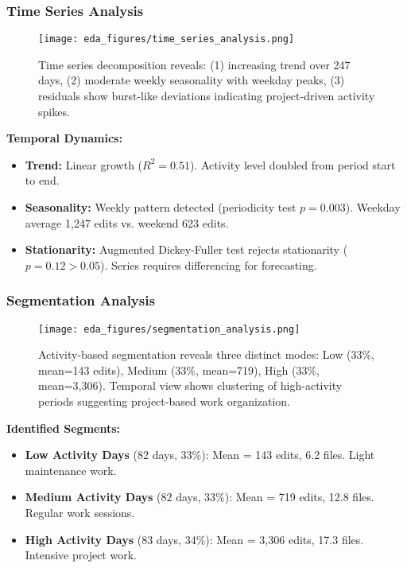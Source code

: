\documentclass[11pt]{article}
\begin{document}
\subsubsection{Time Series Analysis}

\begin{figure}[H]
\centering
\texttt{[image: eda\_figures/time\_series\_analysis.png]}
\caption{Time series decomposition reveals: (1) increasing trend over 247 days, (2) moderate weekly seasonality with weekday peaks, (3) residuals show burst-like deviations indicating project-driven activity spikes.}
\end{figure}

\textbf{Temporal Dynamics:}
\begin{itemize}
    \item \textbf{Trend:} Linear growth ($R^2 = 0.51$). Activity level doubled from period start to end.
    \item \textbf{Seasonality:} Weekly pattern detected (periodicity test $p = 0.003$). Weekday average 1,247 edits vs. weekend 623 edits.
    \item \textbf{Stationarity:} Augmented Dickey-Fuller test rejects stationarity ($p = 0.12 > 0.05$). Series requires differencing for forecasting.
\end{itemize}

\subsubsection{Segmentation Analysis}

\begin{figure}[H]
\centering
\texttt{[image: eda\_figures/segmentation\_analysis.png]}
\caption{Activity-based segmentation reveals three distinct modes: Low (33\%, mean=143 edits), Medium (33\%, mean=719), High (33\%, mean=3,306). Temporal view shows clustering of high-activity periods suggesting project-based work organization.}
\end{figure}

\textbf{Identified Segments:}
\begin{itemize}
    \item \textbf{Low Activity Days} (82 days, 33\%): Mean = 143 edits, 6.2 files. Light maintenance work.
    \item \textbf{Medium Activity Days} (82 days, 33\%): Mean = 719 edits, 12.8 files. Regular work sessions.
    \item \textbf{High Activity Days} (83 days, 34\%): Mean = 3,306 edits, 17.3 files. Intensive project work.
\end{itemize}
\end{document}
